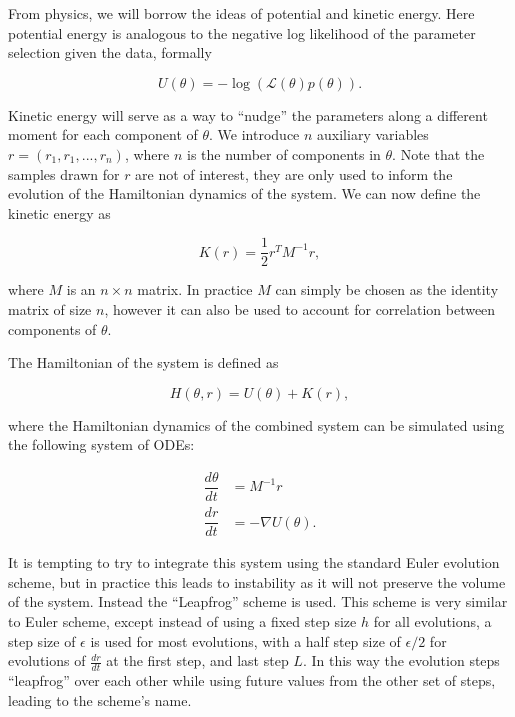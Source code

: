    From physics, we will borrow the ideas of potential and kinetic energy. Here potential energy is analogous to the negative log likelihood of the parameter selection given the data, formally

    \begin{equation}
        U(\theta) = -\log(\mathcal{L}(\theta)p(\theta)).
    \end{equation}

    Kinetic energy will serve as a way to ``nudge'' the parameters along a different moment for each component of $\theta$. We introduce $n$ auxiliary variables $r = (r_1, r_1,...,r_n)$, where $n$ is the number of components in $\theta$. Note that the samples drawn for $r$ are not of interest, they are only used to inform the evolution of the Hamiltonian dynamics of the system. We can now define the kinetic energy as

    \begin{equation}
        K(r) = \frac{1}{2} r^T M^{-1} r,
    \end{equation}

    where $M$ is an $n \times n$ matrix. In practice $M$ can simply be chosen as the identity matrix of size $n$, however it can also be used to account for correlation between components of $\theta$.

    The Hamiltonian of the system is defined as

    \begin{equation}
        H(\theta,r) = U(\theta) + K(r),
    \end{equation}

    where the Hamiltonian dynamics of the combined system can be simulated using the following system of ODEs:

    \begin{equation}
        \begin{array}{rl}
        \displaystyle
            \dfrac{d\theta}{dt} & = M^{-1} r \\
            \dfrac{dr}{dt} & = - \nabla U(\theta) .
        \end{array}
    \end{equation}

    It is tempting to try to integrate this system using the standard Euler evolution scheme, but in practice this leads to instability as it will not preserve the volume of the system. Instead the ``Leapfrog'' scheme is used. This scheme is very similar to Euler scheme, except instead of using a fixed step size $h$ for all evolutions, a step size of $\epsilon$ is used for most evolutions, with a half step size of $\epsilon / 2$ for evolutions of $\frac{dr}{dt}$ at the first step, and last step $L$. In this way the evolution steps ``leapfrog'' over each other while using future values from the other set of steps, leading to the scheme's name.

